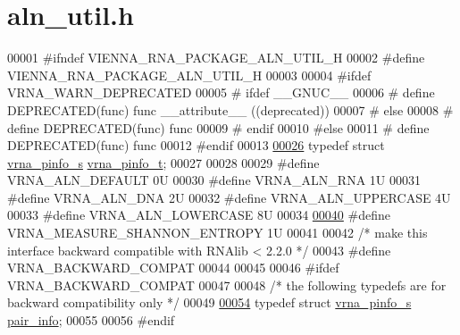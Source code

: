 \hypertarget{aln__util_8h_source}{}\section{aln\+\_\+util.\+h}
\label{aln__util_8h_source}

\begin{DoxyCode}
00001 \textcolor{preprocessor}{#ifndef VIENNA\_RNA\_PACKAGE\_ALN\_UTIL\_H}
00002 \textcolor{preprocessor}{#define VIENNA\_RNA\_PACKAGE\_ALN\_UTIL\_H}
00003 
00004 \textcolor{preprocessor}{#ifdef VRNA\_WARN\_DEPRECATED}
00005 \textcolor{preprocessor}{# ifdef \_\_GNUC\_\_}
00006 \textcolor{preprocessor}{#  define DEPRECATED(func) func \_\_attribute\_\_ ((deprecated))}
00007 \textcolor{preprocessor}{# else}
00008 \textcolor{preprocessor}{#  define DEPRECATED(func) func}
00009 \textcolor{preprocessor}{# endif}
00010 \textcolor{preprocessor}{#else}
00011 \textcolor{preprocessor}{# define DEPRECATED(func) func}
00012 \textcolor{preprocessor}{#endif}
00013 
\hyperlink{group__aln__utils_ga6660dfca23debee7306e0cd53341263f}{00026} \textcolor{keyword}{typedef} \textcolor{keyword}{struct }\hyperlink{group__aln__utils_structvrna__pinfo__s}{vrna\_pinfo\_s} \hyperlink{group__aln__utils_structvrna__pinfo__s}{vrna\_pinfo\_t};
00027 
00028 
00029 \textcolor{preprocessor}{#define VRNA\_ALN\_DEFAULT      0U}
00030 \textcolor{preprocessor}{#define VRNA\_ALN\_RNA          1U}
00031 \textcolor{preprocessor}{#define VRNA\_ALN\_DNA          2U}
00032 \textcolor{preprocessor}{#define VRNA\_ALN\_UPPERCASE    4U}
00033 \textcolor{preprocessor}{#define VRNA\_ALN\_LOWERCASE    8U}
00034 
\hyperlink{group__aln__utils_ga1e659227c9fc077d29989f576f129000}{00040} \textcolor{preprocessor}{#define VRNA\_MEASURE\_SHANNON\_ENTROPY  1U}
00041 
00042 \textcolor{comment}{/* make this interface backward compatible with RNAlib < 2.2.0 */}
00043 \textcolor{preprocessor}{#define VRNA\_BACKWARD\_COMPAT}
00044 
00045 
00046 \textcolor{preprocessor}{#ifdef VRNA\_BACKWARD\_COMPAT}
00047 
00048 \textcolor{comment}{/* the following typedefs are for backward compatibility only */}
00049 
\hyperlink{group__aln__utils_ga7b61662a793ad0aa1ea38efc3a5baacc}{00054} \textcolor{keyword}{typedef} \textcolor{keyword}{struct }\hyperlink{group__aln__utils_structvrna__pinfo__s}{vrna\_pinfo\_s} \hyperlink{group__aln__utils_structvrna__pinfo__s}{pair\_info};
00055 
00056 \textcolor{preprocessor}{#endif}

\end{DoxyCode}
